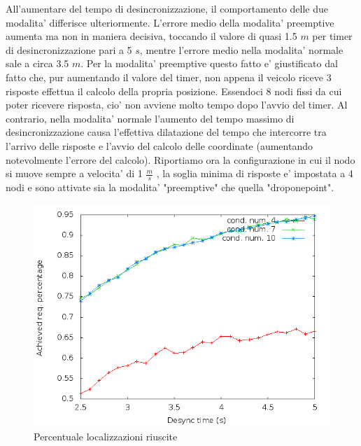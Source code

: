 All'aumentare del tempo di desincronizzazione, il comportamento delle due modalita' differisce ulteriormente. L'errore medio della modalita' preemptive aumenta ma non in maniera decisiva, toccando il valore di quasi 1.5 $m$ per timer di desincronizzazione pari a 5 $s$, mentre l'errore medio nella modalita' normale sale a circa 3.5 $m$. Per la modalita' preemptive questo fatto e' giustificato dal fatto che, pur aumentando il valore del timer, non appena il veicolo riceve 3 risposte effettua il calcolo della propria posizione. Essendoci 8 nodi fissi da cui poter ricevere risposta, cio' non avviene molto tempo dopo l'avvio del timer. Al contrario, nella modalita' normale l'aumento del tempo massimo di desincronizzazione causa l'effettiva dilatazione del tempo che intercorre tra l'arrivo delle risposte e l'avvio del calcolo delle coordinate (aumentando notevolmente l'errore del calcolo).
Riportiamo ora la configurazione in cui il nodo si muove sempre a velocita' di 1 $\frac{m}{s}$ , la soglia minima di risposte e' impostata a 4 nodi e sono attivate sia la modalita' "preemptive" che quella "droponepoint". 
\begin{figure}[H]
    \centering
    \includegraphics[scale=0.5]{octagonsimulation/achievedlocreq4preempt1drop1speed1.png}
    \caption{Percentuale localizzazioni riuscite}
    \label{fig:octagonsimulation/achievedlocreq4preempt1drop1speed1}
\end{figure}
